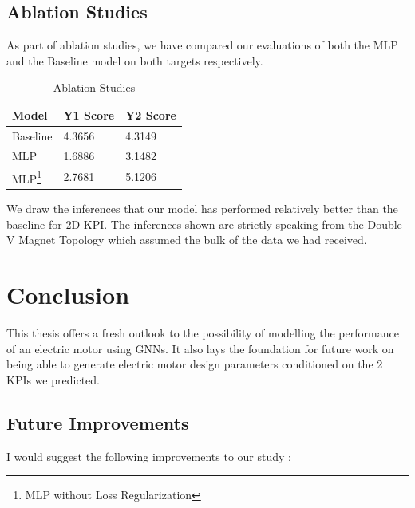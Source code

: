 \documentclass{report} %
\begin{document}
\section{Ablation Studies}\label{sec:Ablation Studies}

As part of ablation studies, we have compared our evaluations of both the \ac{MLP} and the Baseline model on both targets respectively.

\begin{minipage}[t]{\textwidth}
    \begin{table}[H]
        \centering
        \begin{tabular}{|l|l|l|}
        \hline {\bf Model} & {\bf Y1 Score} & {\bf Y2 Score}\\
        \hline 
        Baseline & 4.3656 & 4.3149 \\
        MLP & 1.6886 & 3.1482 \\
        MLP\footnote{\centering MLP without Loss Regularization}  & 2.7681 &  5.1206 \\
        \hline
        \end{tabular}
        \caption{Ablation Studies}
        \label{tab:Ablation Studies}
    \end{table}
\end{minipage}


We draw the inferences that our model has performed relatively better than the baseline for 2D KPI.
The inferences shown are strictly speaking from the Double V Magnet Topology which assumed the bulk of the data we had received.
\newpage 

\chapter{Conclusion}

This thesis offers a fresh outlook to the possibility of modelling the performance of an electric motor using \ac{GNN}s.
It also lays the foundation for future work on being able to generate electric motor design parameters conditioned on the 2 KPIs we predicted.

\section{Future Improvements}\label{sec:Future Improvements}

I would suggest the following improvements to our study : 
\end{document}

